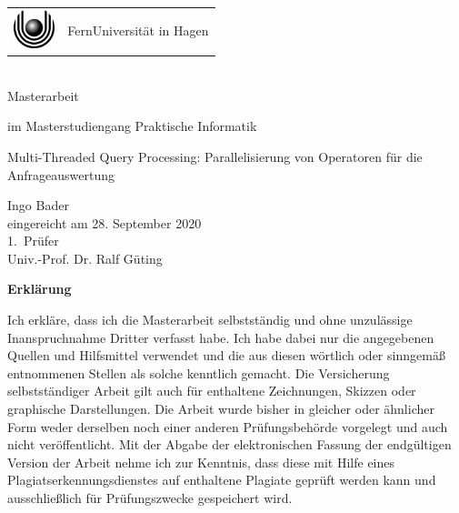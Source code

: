 \documentclass[a4paper,12pt,twoside]{article}
\newcommand{\Theme}{Multi-Threaded Query Processing: Parallelisierung von Operatoren für die Anfrageauswertung}
\newcommand{\Name}{Ingo Bader}
\begin{document}
\thispagestyle{empty}
\pagestyle{empty}

\begin{center}
\begin{huge}
\vspace*{2cm}
    \begin{tabular}{m{1.2cm}@{\ \ }m{9cm}}
      \includegraphics[width=1.2cm]{logo.eps} & {FernUniversität in Hagen}
    \end{tabular}
    \\
    \vspace*{3cm}
   Masterarbeit \\
\end{huge}
\begin{large}
   im Masterstudiengang Praktische Informatik \\[2em]
\end{large}
\begin{huge}
   \glqq{} \Theme \grqq{} \\[2cm]
\end{huge}
\begin{large}
	\Name \\
	eingereicht am 28. September 2020 \\[2cm]
   	1.~Prüfer \\[1em]
   	Univ.-Prof. Dr. Ralf Güting 
\end{large}
\end{center}

\clearpage
\textbf{Erklärung}

Ich erkläre, dass ich die Masterarbeit selbstständig und ohne unzulässige Inanspruchnahme Dritter verfasst habe. Ich habe dabei nur die angegebenen Quellen und Hilfsmittel verwendet und die aus diesen wörtlich oder sinngemäß entnommenen Stellen als solche kenntlich gemacht. Die Versicherung selbstständiger Arbeit gilt auch für enthaltene Zeichnungen, Skizzen oder graphische Darstellungen. Die Arbeit wurde bisher in gleicher oder ähnlicher Form weder derselben noch einer anderen Prüfungsbehörde vorgelegt und auch nicht veröffentlicht. Mit der Abgabe der elektronischen Fassung der endgültigen Version der Arbeit nehme ich zur Kenntnis, dass diese mit Hilfe eines Plagiatserkennungsdienstes auf enthaltene Plagiate geprüft werden kann und ausschließlich für Prüfungszwecke gespeichert wird.
\end{document}
